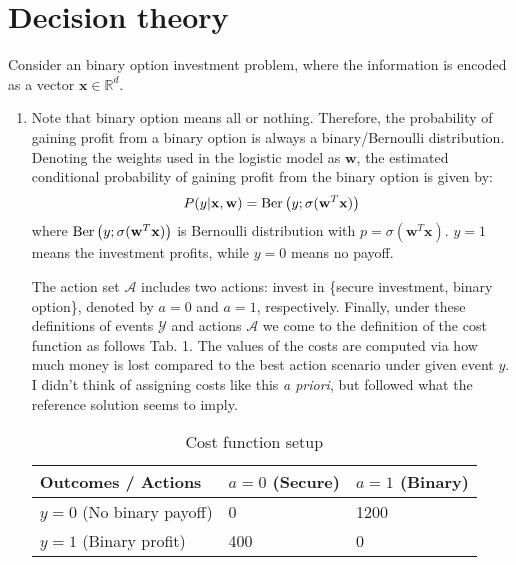 \documentclass[a4paper, 10pt]{article}
\begin{document}
\section{Decision theory}

Consider an binary option investment problem, where the information is encoded as a vector $\mathbf{x} \in \mathbb{R}^d$.

\begin{enumerate}[label=(\alph*)]
    \item Note that binary option means all or nothing. Therefore, the probability of gaining profit from a binary option is always a binary/Bernoulli distribution. Denoting the weights used in the logistic model as $\mathbf{w}$, the estimated conditional probability of gaining profit from the binary option is given by:
    \begin{equation}
        P(y|\mathbf{x}, \mathbf{w}) = {\rm Ber}\left(y; \sigma(\mathbf{w}^T \mathbf{x})\right)
    \end{equation}
    where ${\rm Ber}\left(y; \sigma(\mathbf{w}^T \mathbf{x})\right)$ is Bernoulli distribution with $p=\sigma(\mathbf{w}^T \mathbf{x})$. $y=1$ means the investment profits, while $y=0$ means no payoff.
    
    The action set $\mathcal{A}$ includes two actions: invest in \{secure investment, binary option\}, denoted by $a=0$ and $a=1$, respectively. Finally, under these definitions of events $\mathcal{Y}$ and actions $\mathcal{A}$ we come to the definition of the cost function as follows Tab. 1. The values of the costs are computed via how much money is lost compared to the best action scenario under given event $y$. I didn't think of assigning costs like this \textit{a priori}, but followed what the reference solution seems to imply.

    \begin{table}[ht]
        \centering
        \caption{Cost function setup}
        \begin{tabular}{p{4cm}|p{2.5cm}|p{2.5cm}}
            \toprule
            Outcomes / Actions & $a=0$ (Secure) & $a=1$ (Binary) \\ 
            \midrule
            $y=0$ (No binary payoff) & 0 & 1200 \\
            \hline
            $y=1$ (Binary profit) & 400 & 0 \\
            \bottomrule
        \end{tabular}
    \end{table}


\end{enumerate}
\end{document}
